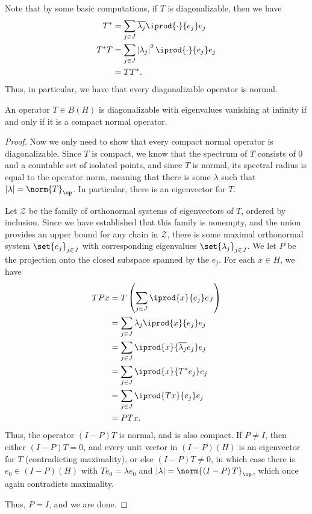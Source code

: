 \documentclass[10pt]{mypackage}
\begin{document}
Note that by some basic computations, if $T$ is diagonalizable, then we have
\begin{align*}
  T^{\ast} &= \sum_{j\in J} \overline{\lambda_j} \iprod{\cdot}{e_j}e_j\\
  T^{\ast}T &= \sum_{j\in J} \left\vert \lambda_j \right\vert^2 \iprod{\cdot}{e_j}e_j\\
            &= TT^{\ast}.
\end{align*}
Thus, in particular, we have that every diagonalizable operator is normal.
\begin{theorem}
  An operator $T\in B(H)$ is diagonalizable with eigenvalues vanishing at infinity if and only if it is a compact normal operator.
\end{theorem}
\begin{proof}
  Now we only need to show that every compact normal operator is diagonalizable. Since $T$ is compact, we know that the spectrum of $T$ consists of $0$ and a countable set of isolated points, and since $T$ is normal, its spectral radius is equal to the operator norm, meaning that there is some $\lambda$ such that $\left\vert \lambda \right\vert = \norm{T}_{\op}$. In particular, there is an eigenvector for $T$.

  Let $\mathcal{Z}$ be the family of orthonormal systems of eigenvectors of $T$, ordered by inclusion. Since we have established that this family is nonempty, and the union provides an upper bound for any chain in $\mathcal{Z}$, there is some maximal orthonormal system $\set{e_j}_{j\in J}$ with corresponding eigenvalues $\set{\lambda_j}_{j\in J}$. We let $P$ be the projection onto the closed subspace spanned by the $e_j$. For each $x\in H$, we have
  \begin{align*}
    TPx &= T\left( \sum_{j\in J} \iprod{x}{e_j}e_J \right)\\
        &= \sum_{j\in J} \lambda_j \iprod{x}{e_j}e_j\\
        &= \sum_{j\in J} \iprod{x}{ \overline{\lambda_j}e_j }e_j\\
        &= \sum_{j\in J} \iprod{x}{T^{\ast}e_j}e_j\\
        &= \sum_{j\in J} \iprod{Tx}{e_j}e_j\\
        &= PTx.
  \end{align*}
  Thus, the operator $\left( I-P \right)T$ is normal, and is also compact. If $P\neq I$, then either $\left( I-P \right)T = 0$, and every unit vector in $\left( I-P \right)(H)$ is an eigenvector for $T$ (contradicting maximality), or else $\left( I-P \right)T\neq 0$, in which case there is $e_0\in \left( I-P \right)(H)$ with $Te_0 = \lambda e_0$ and $\left\vert \lambda \right\vert = \norm{\left( I-P \right)T}_{\op}$, which once again contradicts maximality.

  Thus, $P = I$, and we are done.
\end{proof}
\end{document}
